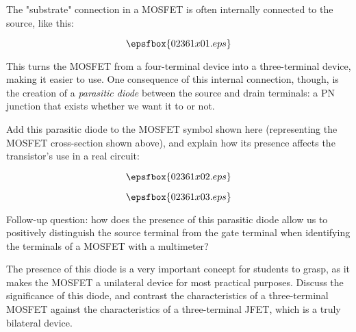 

The "substrate" connection in a MOSFET is often internally connected to the source, like this:

$$\epsfbox{02361x01.eps}$$

This turns the MOSFET from a four-terminal device into a three-terminal device, making it easier to use.  One consequence of this internal connection, though, is the creation of a {\it parasitic diode} between the source and drain terminals: a PN junction that exists whether we want it to or not.

Add this parasitic diode to the MOSFET symbol shown here (representing the MOSFET cross-section shown above), and explain how its presence affects the transistor's use in a real circuit:

$$\epsfbox{02361x02.eps}$$







$$\epsfbox{02361x03.eps}$$

\vskip 10pt

Follow-up question: how does the presence of this parasitic diode allow us to positively distinguish the source terminal from the gate terminal when identifying the terminals of a MOSFET with a multimeter?







The presence of this diode is a very important concept for students to grasp, as it makes the MOSFET a unilateral device for most practical purposes.  Discuss the significance of this diode, and contrast the characteristics of a three-terminal MOSFET against the characteristics of a three-terminal JFET, which is a truly bilateral device.




